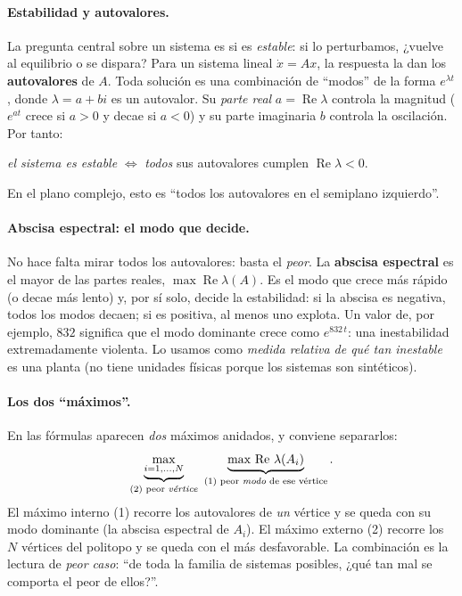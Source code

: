 \paragraph{Estabilidad y autovalores.}
La pregunta central sobre un sistema es si es \emph{estable}: si lo perturbamos,
¿vuelve al equilibrio o se dispara? Para un sistema lineal
$\dot{x}=Ax$, la respuesta la dan los \textbf{autovalores} de $A$. Toda
solución es una combinación de ``modos'' de la forma $e^{\lambda t}$, donde
$\lambda=a+bi$ es un autovalor. Su \emph{parte real} $a=\operatorname{Re}\lambda$
controla la magnitud ($e^{at}$ crece si $a>0$ y decae si $a<0$) y su parte
imaginaria $b$ controla la oscilación. Por tanto:
%
\begin{center}
  \emph{el sistema es estable} $\iff$ \emph{todos} sus autovalores cumplen
  $\operatorname{Re}\lambda<0$.
\end{center}
%
En el plano complejo, esto es ``todos los autovalores en el semiplano
izquierdo''.

\paragraph{Abscisa espectral: el modo que decide.}
No hace falta mirar todos los autovalores: basta el \emph{peor}. La
\textbf{abscisa espectral} es el mayor de las partes reales,
$\max\operatorname{Re}\lambda(A)$. Es el modo que crece más rápido (o decae más
lento) y, por sí solo, decide la estabilidad: si la abscisa es negativa, todos
los modos decaen; si es positiva, al menos uno explota. Un valor de, por
ejemplo, $832$ significa que el modo dominante crece como $e^{832\,t}$: una
inestabilidad extremadamente violenta. Lo usamos como \emph{medida relativa de
qué tan inestable} es una planta (no tiene unidades físicas porque los sistemas
son sintéticos).

\paragraph{Los dos ``máximos''.}
En las fórmulas aparecen \emph{dos} máximos anidados, y conviene separarlos:
%
\begin{equation*}
  \underbrace{\max_{i=1,\dots,N}}_{\text{(2) peor \emph{vértice}}}
  \ \underbrace{\max\,\operatorname{Re}\,\lambda(A_i)}_{\text{(1) peor \emph{modo} de ese vértice}}.
\end{equation*}
%
El máximo interno (1) recorre los autovalores de \emph{un} vértice y se queda
con su modo dominante (la abscisa espectral de $A_i$). El máximo externo (2)
recorre los $N$ vértices del politopo y se queda con el más desfavorable. La
combinación es la lectura de \emph{peor caso}: ``de toda la familia de sistemas
posibles, ¿qué tan mal se comporta el peor de ellos?''.

